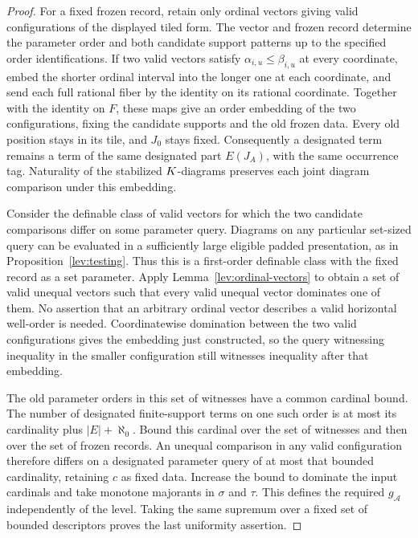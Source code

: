 \begin{proof}
For a fixed frozen record, retain only ordinal vectors giving valid
configurations of the displayed tiled form.  The vector and frozen
record determine the parameter order and both candidate support
patterns up to the specified order identifications.  If two valid
vectors satisfy $\alpha_{i,u}\leq\beta_{i,u}$ at every coordinate,
embed the shorter ordinal interval into the longer one at each
coordinate, and send each full rational fiber by the identity on
its rational coordinate.  Together with the identity on $F$, these
maps give an order embedding of the two configurations, fixing the
candidate supports and the old frozen data.  Every old position
stays in its tile, and $J_0$ stays fixed.  Consequently a designated
term remains a term of the same designated part $E(J_A)$, with the
same occurrence tag.  Naturality of the stabilized $K$-diagrams
preserves each joint diagram comparison under this embedding.

Consider the definable class of valid vectors for which the two
candidate comparisons differ on some parameter query.  Diagrams on
any particular set-sized query can be evaluated in a sufficiently
large eligible padded presentation, as in
Proposition~\ref{lev:testing}.  Thus this is a first-order definable
class with the fixed record as a set parameter.  Apply
Lemma~\ref{lev:ordinal-vectors} to obtain a set of valid unequal
vectors such that every valid unequal vector dominates one of
them.  No assertion that an arbitrary ordinal vector describes a
valid horizontal well-order is needed.  Coordinatewise domination
between the two valid configurations gives the embedding just
constructed, so the query witnessing inequality in the smaller
configuration still witnesses inequality after that embedding.

The old parameter orders in this set of witnesses have a common
cardinal bound.  The number of designated finite-support terms on
one such order is at most its cardinality plus $|E|+\aleph_0$.
Bound this cardinal over the set of witnesses and then over the set
of frozen records.  An unequal comparison in any valid
configuration therefore differs on a designated parameter query of
at most that bounded cardinality, retaining $c$ as fixed data.
Increase the bound to dominate the input cardinals and take
monotone majorants in $\sigma$ and $\tau$.  This defines the required
$g_{\mathcal A}$ independently of the level.  Taking the same
supremum over a fixed set of bounded descriptors proves the last
uniformity assertion.
\end{proof}

